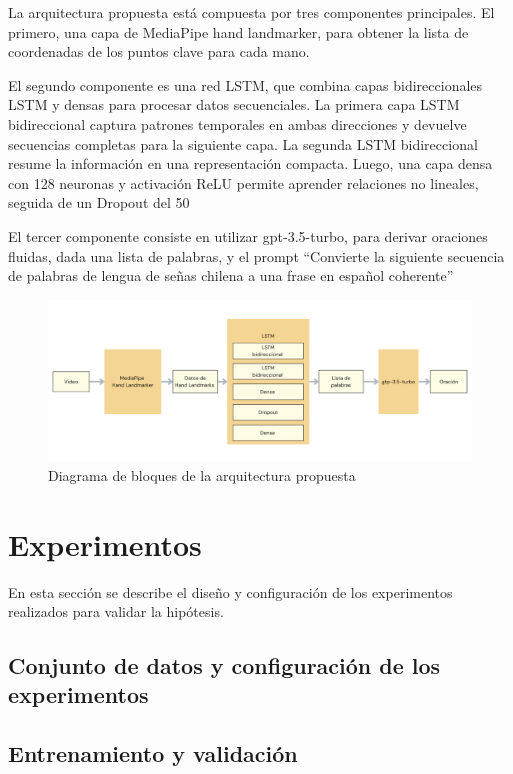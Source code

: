 \documentclass{article}
\begin{document}
La arquitectura propuesta está compuesta por tres componentes principales. El primero, una capa de MediaPipe hand landmarker, para obtener la lista de coordenadas de los puntos clave para cada mano.

El segundo componente es una red LSTM, que combina capas bidireccionales LSTM y densas para procesar datos secuenciales. La primera capa LSTM bidireccional captura patrones temporales en ambas direcciones y devuelve secuencias completas para la siguiente capa. La segunda LSTM bidireccional resume la información en una representación compacta. Luego, una capa densa con 128 neuronas y activación ReLU permite aprender relaciones no lineales, seguida de un Dropout del 50%

El tercer componente consiste en utilizar gpt-3.5-turbo, para derivar oraciones fluidas, dada una lista de palabras, y el prompt “Convierte la siguiente secuencia de palabras de lengua de señas chilena a una frase en español coherente”

\begin{figure}[!hbtp]
    \centering
    \includegraphics[width=5in]{figuras/architecture-diagram.png}
		\caption{Diagrama de bloques de la arquitectura propuesta}
		\label{fig7}
\end{figure}

\section{Experimentos}

En esta sección se describe el diseño y configuración de los experimentos realizados para validar la hipótesis.

\subsection{ Conjunto de datos y configuración de los experimentos }
\subsection{ Entrenamiento y validación }
\end{document}
